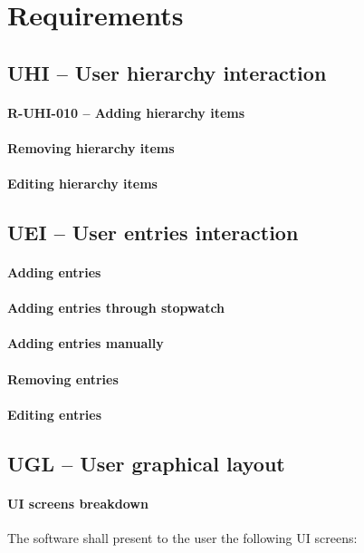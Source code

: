 \section{Requirements}
\subsection{UHI -- User hierarchy interaction}
\paragraph{R-UHI-010 -- Adding hierarchy items}

\paragraph{Removing hierarchy items}

\paragraph{Editing hierarchy items}

\subsection{UEI -- User entries interaction}
\paragraph{Adding entries}
\paragraph{Adding entries through stopwatch}
\paragraph{Adding entries manually}
\paragraph{Removing entries}
\paragraph{Editing entries}

\subsection{UGL -- User graphical layout}
\paragraph{UI screens breakdown}
The software shall present to the user the following UI screens:

